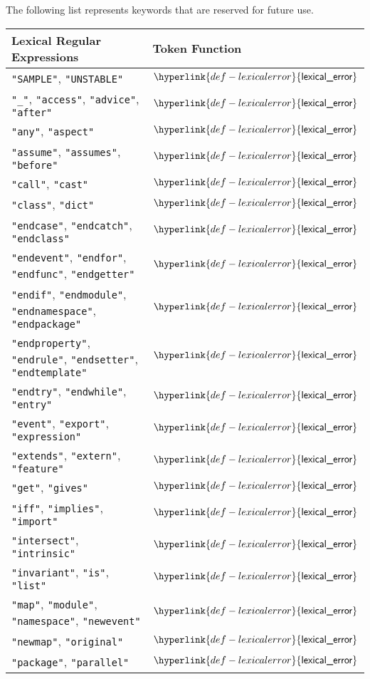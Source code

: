 \documentclass{book}
\newcommand\lexicalerror[0]{\hyperlink{def-lexicalerror}{\textsf{lexical\_error}}}
\begin{document}
The following list represents keywords that are reserved for future use.
\begin{center}
\begin{tabular}{ll}
\textbf{Lexical Regular Expressions} & \textbf{Token Function}\\
\hline
\texttt{"SAMPLE"}, \texttt{"UNSTABLE"} & $\lexicalerror$ \\
\texttt{"\_"}, \texttt{"access"}, \texttt{"advice"}, \texttt{"after"} & $\lexicalerror$ \\
\texttt{"any"}, \texttt{"aspect"} & $\lexicalerror$ \\
\texttt{"assume"}, \texttt{"assumes"}, \texttt{"before"} & $\lexicalerror$ \\
\texttt{"call"}, \texttt{"cast"} & $\lexicalerror$ \\
\texttt{"class"}, \texttt{"dict"} & $\lexicalerror$ \\
\texttt{"endcase"}, \texttt{"endcatch"}, \texttt{"endclass"} & $\lexicalerror$ \\
\texttt{"endevent"}, \texttt{"endfor"}, \texttt{"endfunc"}, \texttt{"endgetter"} & $\lexicalerror$ \\
\texttt{"endif"}, \texttt{"endmodule"}, \texttt{"endnamespace"}, \texttt{"endpackage"} & $\lexicalerror$ \\
\texttt{"endproperty"}, \texttt{"endrule"}, \texttt{"endsetter"}, \texttt{"endtemplate"} & $\lexicalerror$ \\
\texttt{"endtry"}, \texttt{"endwhile"}, \texttt{"entry"} & $\lexicalerror$ \\
\texttt{"event"}, \texttt{"export"}, \texttt{"expression"} & $\lexicalerror$ \\
\texttt{"extends"}, \texttt{"extern"}, \texttt{"feature"} & $\lexicalerror$ \\
\texttt{"get"}, \texttt{"gives"} & $\lexicalerror$ \\
\texttt{"iff"}, \texttt{"implies"}, \texttt{"import"} & $\lexicalerror$ \\
\texttt{"intersect"}, \texttt{"intrinsic"} & $\lexicalerror$ \\
\texttt{"invariant"}, \texttt{"is"}, \texttt{"list"} & $\lexicalerror$ \\
\texttt{"map"}, \texttt{"module"}, \texttt{"namespace"}, \texttt{"newevent"} & $\lexicalerror$ \\
\texttt{"newmap"}, \texttt{"original"} & $\lexicalerror$ \\
\texttt{"package"}, \texttt{"parallel"} & $\lexicalerror$ \\

\end{tabular}
\end{center}
\end{document}
